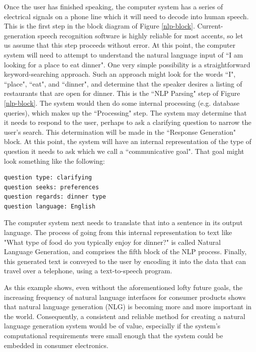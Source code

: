 Once the user has finished speaking, the computer system has a series of electrical signals on
a phone line which it will need to decode into human speech.  This is the first step
in the block diagram of Figure \ref{nlp-block}.  Current-generation speech recognition
software is highly reliable for most accents, so let us assume that this step proceeds without
error.  At this point, the computer system will need to attempt to understand the natural
language input of ``I am looking for a place to eat dinner". One very simple possibility is
a straightforward keyword-searching approach.  Such an approach might look for the words ``I",
``place", ``eat", and ``dinner", and determine that the speaker desires a listing of restaurants that
are open for dinner.  This is the ``NLP Parsing" step of Figure \ref{nlp-block}.  The system would
then do some internal processing (e.g. database queries), which makes up the ``Processing"
step.  The system may determine that it needs to respond to the user, perhaps to ask a
clarifying question to narrow the user's search.  This determination will be made in the
``Response Generation" block.  At this point, the system will have an internal representation
of the type of question it needs to ask which we call a ``communicative goal".  That goal might
look something like the following:
\begin{verbatim}
question type: clarifying
question seeks: preferences
question regards: dinner type
question language: English
\end{verbatim}

The computer system next needs to translate that into a sentence in its output
language.  The process of going from this internal representation to text like
"What type of food do you typically enjoy for dinner?" is called Natural Language Generation,
and comprises the fifth block of the NLP process.  Finally, this generated text is conveyed to
the user by encoding it into the data that can travel over a telephone, using a text-to-speech
program.

As this example shows, even without the aforementioned lofty future goals,
the increasing frequency of natural language interfaces for consumer
products shows that natural language generation (NLG) is becoming more and more important
in the world.  Consequently, a consistent and reliable method for creating a natural
language generation system would be of value, especially if the system's
computational requirements were small enough that the system could be embedded
in consumer electronics.

